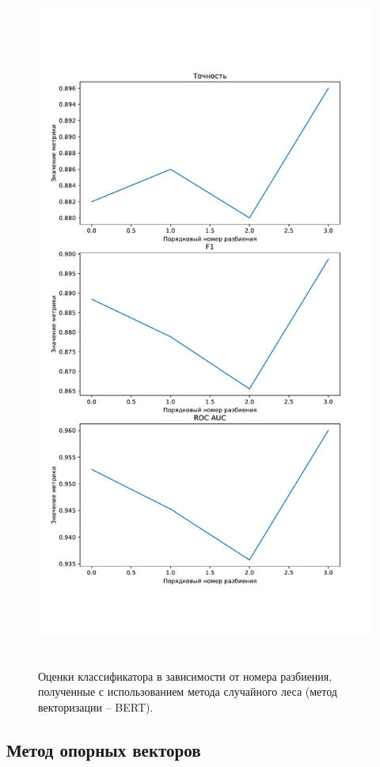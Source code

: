 \begin{figure}[H]
	\centering
	\includegraphics[height=23cm]{inc/plots/randomMetricsBert.pdf}
	\caption{ Оценки классификатора в зависимости от номера разбиения, полученные с использованием метода случайного леса (метод векторизации -- BERT). }
	\label{img:randomMetricsBert}
\end{figure}



\subsection{Метод опорных векторов }

